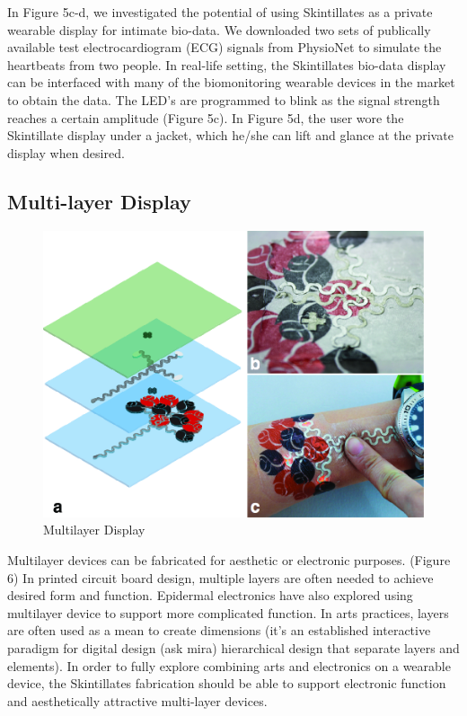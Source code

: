 \documentclass{sigchi}
\begin{document}
In Figure 5c-d, we investigated the potential of using Skintillates as a private wearable display for intimate bio-data. We downloaded two sets of publically available test electrocardiogram (ECG) signals from PhysioNet to simulate the heartbeats from two people. In real-life setting, the Skintillates bio-data display can be interfaced with many of the biomonitoring wearable devices in the market to obtain the data. The LED’s are programmed to blink as the signal strength reaches a certain amplitude (Figure 5c). In Figure 5d, the user wore the Skintillate display under a jacket, which he/she can lift and glance at the private display when desired. 

\subsection{Multi-layer Display}
\begin{figure}[!h]
\centering
\includegraphics[width=1\columnwidth]{figures/Figure6}
\caption{Multilayer Display}
\label{fig:figure6}
\end{figure}
Multilayer devices can be fabricated for aesthetic or electronic purposes. (Figure 6) In printed circuit board design, multiple layers are often needed to achieve desired form and function. Epidermal electronics have also explored using multilayer device to support more complicated function. In arts practices, layers are often used as a mean to create dimensions (it's an established interactive paradigm for digital design (ask mira) hierarchical design that separate layers and elements). In order to fully explore combining arts and electronics on a wearable device, the Skintillates fabrication should be able to support electronic function and aesthetically attractive multi-layer devices.  
\end{document}
